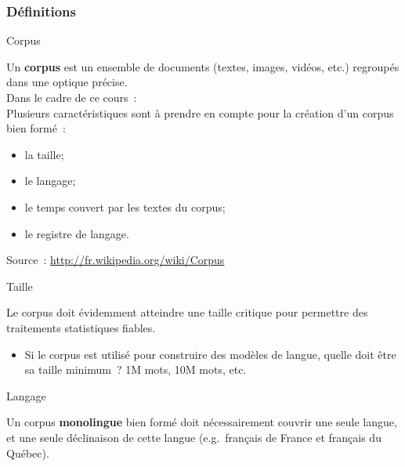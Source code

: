\begin{frame}[allowframebreaks]
\frametitle{Définitions}

\begin{block}{Corpus}

Un \textbf{corpus} est un ensemble de documents (textes, images, vidéos, etc.) 
regroupés dans une optique précise.\\[0.5em]

Dans le cadre de ce cours~: \alert{}\\[0.5em]

Plusieurs caractéristiques sont à prendre en compte pour la création d'un corpus
bien formé~:

	\begin{itemize}
		\item la taille;
		\item le langage;
		\item le temps couvert par les textes du corpus;
		\item le registre de langage.
	\end{itemize}

\end{block}

Source~: \url{http://fr.wikipedia.org/wiki/Corpus}

\framebreak

\begin{block}{Taille}

Le corpus doit évidemment atteindre une taille critique pour permettre des 
traitements statistiques fiables.

    \begin{itemize}
        \item Si le corpus est utilisé pour construire des modèles de langue, quelle 
              doit être sa taille minimum~? 1M mots, 10M mots, etc.
    \end{itemize}

\end{block}

\begin{block}{Langage}

Un corpus \textbf{monolingue} bien formé doit nécessairement couvrir une seule 
langue, et une seule déclinaison de cette langue (e.g.~français de France et 
français du Québec).

\end{block}


\end{frame}
